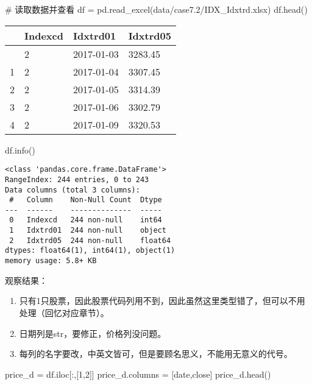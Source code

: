 \documentclass[
  letterpaper,
  DIV=11,
  numbers=noendperiod]{scrreprt}
\newenvironment{Shaded}{\begin{snugshade}}{\end{snugshade}}
\newcommand{\CommentTok}[1]{\textcolor[rgb]{0.37,0.37,0.37}{#1}}
\newcommand{\DecValTok}[1]{\textcolor[rgb]{0.68,0.00,0.00}{#1}}
\newcommand{\NormalTok}[1]{\textcolor[rgb]{0.00,0.23,0.31}{#1}}
\newcommand{\OperatorTok}[1]{\textcolor[rgb]{0.37,0.37,0.37}{#1}}
\newcommand{\StringTok}[1]{\textcolor[rgb]{0.13,0.47,0.30}{#1}}
\providecommand{\tightlist}{%
  \setlength{\itemsep}{0pt}\setlength{\parskip}{0pt}}\usepackage{longtable,booktabs,array}
\begin{document}
\begin{Shaded}
\begin{Highlighting}[]
\CommentTok{\#  读取数据并查看}
\NormalTok{df }\OperatorTok{=}\NormalTok{ pd.read\_excel(}\StringTok{\textquotesingle{}data/case7.2/IDX\_Idxtrd.xlsx\textquotesingle{}}\NormalTok{)}
\NormalTok{df.head() }
\end{Highlighting}
\end{Shaded}

\begin{longtable}[]{@{}llll@{}}
\toprule\noalign{}
& Indexcd & Idxtrd01 & Idxtrd05 \\
\midrule\noalign{}
\endhead
\bottomrule\noalign{}
\endlastfoot
0 & 2 & 2017-01-03 & 3283.45 \\
1 & 2 & 2017-01-04 & 3307.45 \\
2 & 2 & 2017-01-05 & 3314.39 \\
3 & 2 & 2017-01-06 & 3302.79 \\
4 & 2 & 2017-01-09 & 3320.53 \\
\end{longtable}

\begin{Shaded}
\begin{Highlighting}[]
\NormalTok{df.info()}
\end{Highlighting}
\end{Shaded}

\begin{verbatim}
<class 'pandas.core.frame.DataFrame'>
RangeIndex: 244 entries, 0 to 243
Data columns (total 3 columns):
 #   Column    Non-Null Count  Dtype  
---  ------    --------------  -----  
 0   Indexcd   244 non-null    int64  
 1   Idxtrd01  244 non-null    object 
 2   Idxtrd05  244 non-null    float64
dtypes: float64(1), int64(1), object(1)
memory usage: 5.8+ KB
\end{verbatim}

观察结果：

\begin{enumerate}
\def\labelenumi{\arabic{enumi}.}
\tightlist
\item
  只有1只股票，因此股票代码列用不到，因此虽然这里类型错了，但可以不用处理（回忆对应章节）。
\item
  日期列是str，要修正，价格列没问题。
\item
  每列的名字要改，中英文皆可，但是要顾名思义，不能用无意义的代号。
\end{enumerate}

\begin{Shaded}
\begin{Highlighting}[]
\NormalTok{price\_d }\OperatorTok{=}\NormalTok{ df.iloc[:,[}\DecValTok{1}\NormalTok{,}\DecValTok{2}\NormalTok{]]}
\NormalTok{price\_d.columns }\OperatorTok{=}\NormalTok{ [}\StringTok{\textquotesingle{}date\textquotesingle{}}\NormalTok{,}\StringTok{\textquotesingle{}close\textquotesingle{}}\NormalTok{]}
\NormalTok{price\_d.head()}
\end{Highlighting}
\end{Shaded}
\end{document}
